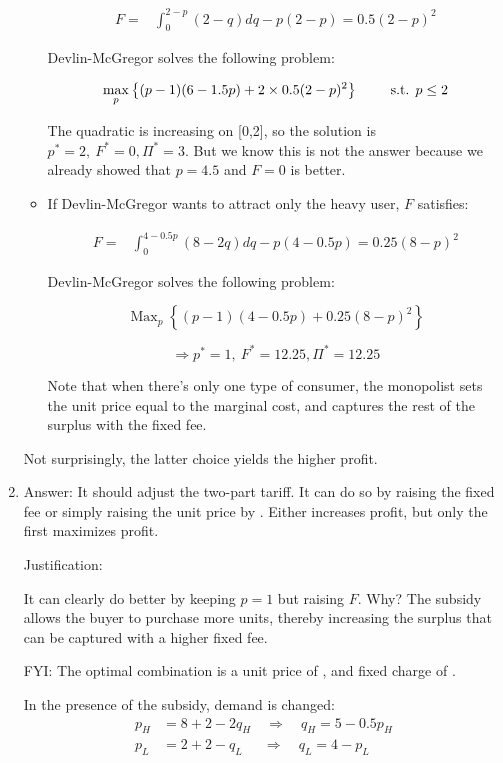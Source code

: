 \documentclass{article}
\DeclareMathOperator*{\Max}{Max}
\newcommand{\st}{\hbox{ s.t. }}
\newenvironment{solution}{\color{red}}{\color{black}}
\begin{document}
\begin{solution}
\begin{enumerate}
\begin{itemize}
\[ \begin{aligned}F=& \int_{0}^{2-p}(2-q)dq-p(2-p)
= 0.5(2-p)^2
\end{aligned} \]

Devlin-McGregor solves the following problem:

\[ \max_p \left\{ (p-1)(6-1.5p)+2 \times 0.5(2-p)^2 \right\} \qquad \st p\leq 2 \]

The quadratic is increasing on [0,2], so the solution is $p^*=2,\ F^*=0, \Pi^*=3$. But we know this is not the answer because we already showed that $p=4.5$ and $F=0$ is better.

\item If Devlin-McGregor wants to attract only the heavy user, $F$ satisfies:

\[ \begin{aligned}F=& \int_{0}^{4-0.5p}(8-2q)dq-p(4-0.5p)
= 0.25(8-p)^2
\end{aligned} \]

Devlin-McGregor solves the following problem:

\[ \Max_p \left\{ (p-1)(4-0.5p)+0.25(8-p)^2 \right\} \]

\[ \Rightarrow p^*=1,\ F^*=12.25, \Pi^*=12.25 \]

Note that when there's only one type of consumer, the monopolist sets the unit price equal to the marginal cost, and captures the rest of the surplus with the fixed fee.
\end{itemize}
Not surprisingly, the latter choice yields the higher profit.

\item Answer: It should adjust the two-part tariff. It can do so by raising the fixed fee or simply raising the unit price by . Either increases profit, but only the first maximizes profit.

Justification:

It can clearly do better by keeping $p = 1$ but raising $F$. Why? The subsidy allows the buyer to purchase more units, thereby increasing the surplus that can be captured with a higher fixed fee.

FYI: The optimal combination is a  unit price of , and fixed charge of .

In the presence of the subsidy, demand is changed:
\[ \begin{aligned}	
p_H&=8+2-2q_H  \quad \Rightarrow \quad  q_H=5-0.5p_H \\
p_L&=2+2-q_L \ \  \quad \Rightarrow \quad q_L=4-p_L
\end{aligned} \]


\end{enumerate}
\end{solution}
\end{document}
